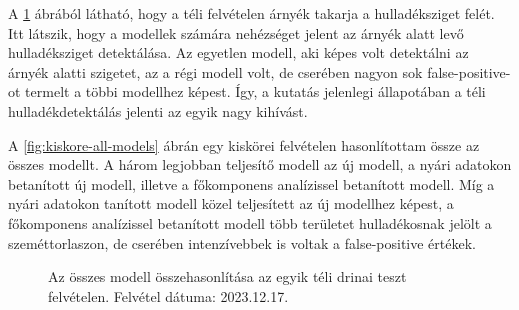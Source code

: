 A \ref{fig:drina-winter-all-models} ábrából látható, hogy a téli felvételen árnyék takarja a hulladéksziget felét. Itt látszik, hogy a modellek számára nehézséget jelent az árnyék alatt levő hulladéksziget detektálása. Az egyetlen modell, aki képes volt detektálni az árnyék alatti szigetet, az a régi modell volt, de cserében nagyon sok false-positive-ot termelt a többi modellhez képest. Így, a kutatás jelenlegi állapotában a téli hulladékdetektálás jelenti az egyik nagy kihívást.

A \ref{fig:kiskore-all-models} ábrán egy kiskörei felvételen hasonlítottam össze az összes modellt. A három legjobban teljesítő modell az új modell, a nyári adatokon betanított új modell, illetve a főkomponens analízissel betanított modell. Míg a nyári adatokon tanított modell közel teljesített az új modellhez képest, a főkomponens analízissel betanított modell több területet hulladékosnak jelölt a szeméttorlaszon, de cserében intenzívebbek is voltak a false-positive értékek.

\begin{figure}[H]
	\centering
	\hspace{5pt}
	\hspace{5pt}
	\hspace{5pt}
	\hspace{5pt}
	\hspace{5pt}
	\caption{Az összes modell összehasonlítása az egyik téli drinai teszt felvételen. Felvétel dátuma: 2023.12.17.}
	\label{fig:drina-winter-all-models}
\end{figure}


